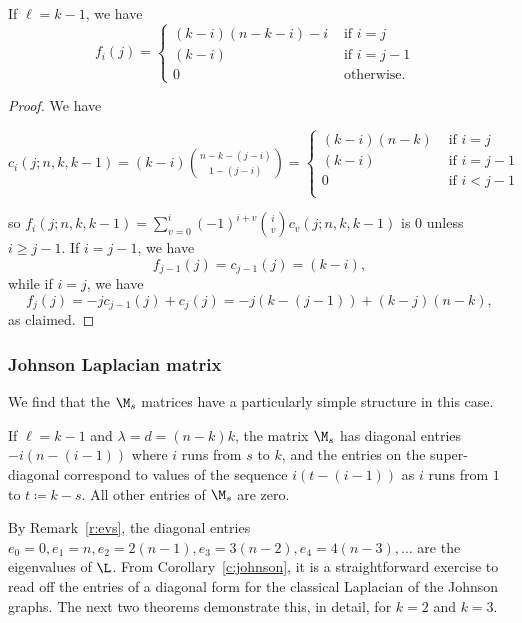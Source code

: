 \begin{lemma}\label{l:johnson_M}
If $\ell = k-1$, we have
\[ f_{i}(j) = \begin{cases} 
 (k-i)(n-k-i) - i   & \text{ if $i = j$ } \\
 (k-i)       & \text{ if $i = j-1$ } \\
 0       & \text{ otherwise. }
\end{cases} \]
\end{lemma}
\begin{proof}
We have

$c_i(j; n, k, k-1) = (k-i) \binom{n-k-(j-i)}{1-(j-i)} 
= \begin{cases}
    (k-i) (n-k) & \text{ if $i = j$ } \\
    (k-i)  & \text{ if $i = j-1$ } \\
    0 & \text{ if $i < j-1$ } \\
    \end{cases}$

\noindent
so $f_i(j; n, k, k-1) = \sum_{v=0}^i (-1)^{i+v} \binom{i}{v} c_v(j; n, k, k-1)$ is $0$ unless $i \geq j-1$.
If $i = j-1$, we have
\[ f_{j-1}(j) = c_{j-1}(j) = (k-i), \]
while if $i = j$, we have
\[ f_j(j) = - j c_{j-1}(j) + c_j(j) = -j (k-(j-1)) +  (k-j) (n-k), \]
as claimed.
\end{proof}


\subsubsection{Johnson Laplacian matrix}

We find that the $\M_s$ matrices have a particularly simple structure in this case.

\begin{corollary}\label{c:johnson} 
If $\ell = k-1$ and $\lambda = d = (n-k)k$, the matrix $\M_s$ has diagonal entries $-i(n-(i-1))$ where $i$ runs from $s$ to $k$, and the entries on the super-diagonal correspond to values of the sequence $i(t-(i-1))$ as $i$ runs from $1$ to $t \coloneqq  k-s$.  All other entries of $\M_s$ are zero.
\end{corollary}

By Remark~\ref{r:evs}, the diagonal entries $e_0 = 0, e_1 = n, e_2 = 2(n-1), e_3 = 3(n-2), e_4 = 4(n-3), \ldots$ are the eigenvalues of $\L$.  From Corollary~\ref{c:johnson}, it is a straightforward exercise to read off the entries of a diagonal form for the classical Laplacian of the Johnson graphs.  The next two theorems demonstrate this, in detail, for $k = 2$ and $k = 3$.

